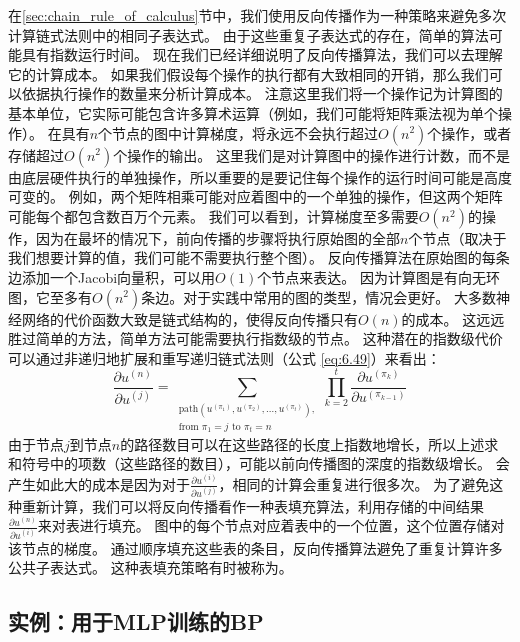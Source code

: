 在\ref{sec:chain_rule_of_calculus}节中，我们使用反向传播作为一种策略来避免多次计算链式法则中的相同子表达式。
由于这些重复子表达式的存在，简单的算法可能具有指数运行时间。
现在我们已经详细说明了反向传播算法，我们可以去理解它的计算成本。
如果我们假设每个操作的执行都有大致相同的开销，那么我们可以依据执行操作的数量来分析计算成本。
注意这里我们将一个操作记为计算图的基本单位，它实际可能包含许多算术运算（例如，我们可能将矩阵乘法视为单个操作）。
在具有$n$个节点的图中计算梯度，将永远不会执行超过$O(n^2)$个操作，或者存储超过$O(n^2)$个操作的输出。
这里我们是对计算图中的操作进行计数，而不是由底层硬件执行的单独操作，所以重要的是要记住每个操作的运行时间可能是高度可变的。
例如，两个矩阵相乘可能对应着图中的一个单独的操作，但这两个矩阵可能每个都包含数百万个元素。
我们可以看到，计算梯度至多需要$O(n^2)$的操作，因为在最坏的情况下，前向传播的步骤将执行原始图的全部$n$个节点（取决于我们想要计算的值，我们可能不需要执行整个图）。
反向传播算法在原始图的每条边添加一个Jacobi向量积，可以用$O(1)$个节点来表达。
因为计算图是有向无环图，它至多有$O(n^2)$条边。对于实践中常用的图的类型，情况会更好。
大多数神经网络的代价函数大致是链式结构的，使得反向传播只有$O(n)$的成本。
这远远胜过简单的方法，简单方法可能需要执行指数级的节点。
这种潜在的指数级代价可以通过非递归地扩展和重写递归链式法则（公式
\ref{eq:6.49}）来看出：
\begin{equation}
  \frac{\partial u^{(n)}}{\partial u^{(j)}} =
  \sum_{\substack{\text{path}(u^{(\pi_1)}, u^{(\pi_2)}, \ldots, u^{(\pi_t)}  ),\\ \text{from } \pi_1=j \text{ to }\pi_t = n}}
  \prod_{k=2}^t \frac{\partial u^{(\pi_k)}}{\partial u^{(\pi_{k-1})}}
\end{equation}
由于节点$j$到节点$n$的路径数目可以在这些路径的长度上指数地增长，所以上述求和符号中的项数（这些路径的数目），可能以前向传播图的深度的指数级增长。
会产生如此大的成本是因为对于$\frac{\partial u^{(i)}}{\partial u^{(j)}}$，相同的计算会重复进行很多次。
为了避免这种重新计算，我们可以将反向传播看作一种表填充算法，利用存储的中间结果$\frac{\partial u^{(n)}}{\partial u^{(i)}}$来对表进行填充。
图中的每个节点对应着表中的一个位置，这个位置存储对该节点的梯度。
通过顺序填充这些表的条目，反向传播算法避免了重复计算许多公共子表达式。
这种表填充策略有时被称为。
  
  
\subsection{实例：用于MLP训练的BP}
\label{sec:example_back_propagation_for_mlp_Training}

